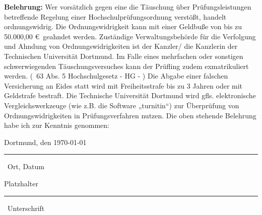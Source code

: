 \textbf{Belehrung:} \vspace{0,25cm}
\newline
Wer vorsätzlich gegen eine die Täuschung über Prüfungsleistungen betreffende Re\-ge\-lung einer Hochschulprüfungsordnung verstößt, handelt ordnungswidrig. Die Ordnungs\-widrig\-keit kann mit einer Geldbuße von bis zu 50.000,00 \euro\ geahndet werden. Zuständige Verwaltungsbehörde für die Verfolgung und Ahndung von Ordnungswidrigkeiten ist der Kanzler/ die Kanzlerin der Technischen Universität Dortmund. Im Falle eines mehrfachen oder sonstigen schwerwiegenden Täuschungsversuches kann der Prüfling zudem exmatrikuliert werden. (\textsection\ 63 Abs. 5 Hochschulgesetz - HG - )
\vspace{0,25cm} \newline
Die Abgabe einer falschen Versicherung an Eides statt wird mit Freiheitsstrafe bis zu 3 Jahren oder mit Geldstrafe bestraft.
\vspace{0,25cm} \newline
Die Technische Universität Dortmund wird gfls. elektronische Vergleichswerkzeuge (wie z.B. die Software „turnitin“) zur Überprüfung von Ordnungswidrigkeiten in Prüfungsverfahren nutzen.
\vspace{0,25cm} \newline
Die oben stehende Belehrung habe ich zur Kenntnis genommen:
\vspace*{1cm}

\parbox{6.2cm}{ Dortmund, den \today
\vspace*{0,1cm}
\hrule
\vspace*{0,1cm}
\strut \small \ Ort, Datum} \hfill
\parbox{5cm}{ \color{white} Platzhalter \color{black}
\vspace*{0,1cm}
\hrule
\vspace*{0,1cm}
\strut \small \ Unterschrift}

%


